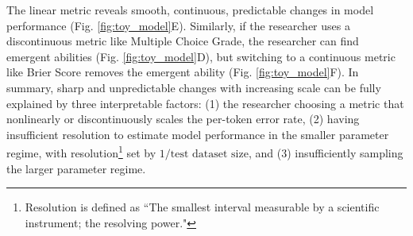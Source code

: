 The linear metric reveals smooth, continuous, predictable changes in model performance (Fig. \ref{fig:toy_model}E).
Similarly, if the researcher uses a discontinuous metric like Multiple Choice Grade, the researcher can find emergent abilities (Fig. \ref{fig:toy_model}D), but switching to a continuous metric like Brier Score removes the emergent ability (Fig. \ref{fig:toy_model}F).
In summary, sharp and unpredictable changes with increasing scale can be fully explained by three interpretable factors: (1) the researcher choosing a metric that nonlinearly or discontinuously scales the per-token error rate, (2) having insufficient resolution to estimate model performance in the smaller parameter regime, with resolution\footnote{Resolution is defined as ``The smallest interval measurable by a scientific instrument; the resolving power."} set by $1/\text{test dataset size}$, and (3) insufficiently sampling the larger parameter regime. 